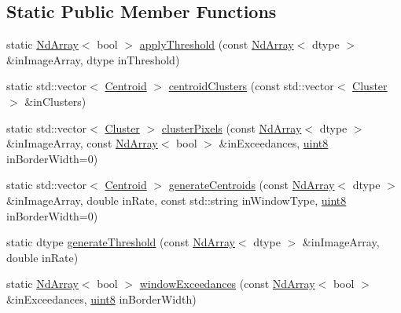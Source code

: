 \subsection*{Static Public Member Functions}
\begin{DoxyCompactItemize}
\item 
static \mbox{\hyperlink{class_num_c_1_1_nd_array}{Nd\+Array}}$<$ bool $>$ \mbox{\hyperlink{class_num_c_1_1_image_processing_aded7e1bfe750f7cda5a896b629136d3a}{apply\+Threshold}} (const \mbox{\hyperlink{class_num_c_1_1_nd_array}{Nd\+Array}}$<$ dtype $>$ \&in\+Image\+Array, dtype in\+Threshold)
\item 
static std\+::vector$<$ \mbox{\hyperlink{class_num_c_1_1_image_processing_1_1_centroid}{Centroid}} $>$ \mbox{\hyperlink{class_num_c_1_1_image_processing_aff77622fa4d58b8e66a2e0b1fc75ff66}{centroid\+Clusters}} (const std\+::vector$<$ \mbox{\hyperlink{class_num_c_1_1_image_processing_1_1_cluster}{Cluster}} $>$ \&in\+Clusters)
\item 
static std\+::vector$<$ \mbox{\hyperlink{class_num_c_1_1_image_processing_1_1_cluster}{Cluster}} $>$ \mbox{\hyperlink{class_num_c_1_1_image_processing_a5625fbfbf91275e8072e2239af85d8c8}{cluster\+Pixels}} (const \mbox{\hyperlink{class_num_c_1_1_nd_array}{Nd\+Array}}$<$ dtype $>$ \&in\+Image\+Array, const \mbox{\hyperlink{class_num_c_1_1_nd_array}{Nd\+Array}}$<$ bool $>$ \&in\+Exceedances, \mbox{\hyperlink{namespace_num_c_a60b2e2f49e1ff61059731c154e560869}{uint8}} in\+Border\+Width=0)
\item 
static std\+::vector$<$ \mbox{\hyperlink{class_num_c_1_1_image_processing_1_1_centroid}{Centroid}} $>$ \mbox{\hyperlink{class_num_c_1_1_image_processing_a34e42cb92932de6219ccfe796c8ffeab}{generate\+Centroids}} (const \mbox{\hyperlink{class_num_c_1_1_nd_array}{Nd\+Array}}$<$ dtype $>$ \&in\+Image\+Array, double in\+Rate, const std\+::string in\+Window\+Type, \mbox{\hyperlink{namespace_num_c_a60b2e2f49e1ff61059731c154e560869}{uint8}} in\+Border\+Width=0)
\item 
static dtype \mbox{\hyperlink{class_num_c_1_1_image_processing_ac700f57ca979bf4752fb89591b5e4b7a}{generate\+Threshold}} (const \mbox{\hyperlink{class_num_c_1_1_nd_array}{Nd\+Array}}$<$ dtype $>$ \&in\+Image\+Array, double in\+Rate)
\item 
static \mbox{\hyperlink{class_num_c_1_1_nd_array}{Nd\+Array}}$<$ bool $>$ \mbox{\hyperlink{class_num_c_1_1_image_processing_a50c06a1a3fe158dbaa14878407063da9}{window\+Exceedances}} (const \mbox{\hyperlink{class_num_c_1_1_nd_array}{Nd\+Array}}$<$ bool $>$ \&in\+Exceedances, \mbox{\hyperlink{namespace_num_c_a60b2e2f49e1ff61059731c154e560869}{uint8}} in\+Border\+Width)
\end{DoxyCompactItemize}


